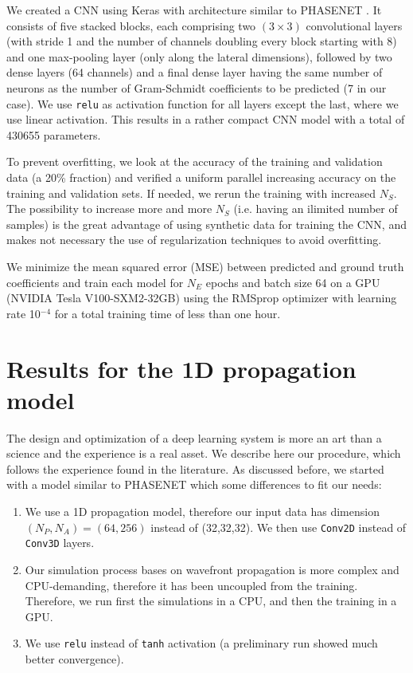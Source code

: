 \documentclass{iucr}
\begin{document}
We created a CNN using Keras \cite{keras} with architecture similar to PHASENET \cite{Saha2020}. It consists of five stacked blocks, each comprising two $(3 \times 3 )$ convolutional layers (with stride 1 and the number of channels doubling every block starting with 8) and one max-pooling layer (only along the lateral dimensions), followed by two dense layers (64 channels) and a final dense layer having the same number of neurons as the number of Gram-Schmidt coefficients to be predicted (7 in our case). We use \texttt{relu} as activation function for all layers except the last, where we use linear activation. This results in a rather compact CNN model with a total of 430655 parameters.

To prevent overfitting, we look at the accuracy of the training and validation data (a 20\% fraction) and verified a uniform parallel increasing accuracy on the training and validation sets. If needed, we rerun the training with increased $N_S$. The possibility to increase more and more $N_S$ (i.e. having an ilimited number of samples) is the great advantage of using synthetic data for training the CNN, and makes not necessary the use of regularization techniques to avoid overfitting.

We minimize the mean squared error (MSE) between predicted and ground truth coefficients and train each model for $N_E$ epochs and batch size 64 on a GPU (NVIDIA Tesla V100-SXM2-32GB) using the RMSprop optimizer with learning rate 10$^{-4}$ for a total training time of less than one hour.


\section{Results for the 1D propagation model}\label{sec:results}

The design and optimization of a deep learning system is more an art than a science \cite{chollet_book} and the experience is a real asset. We describe here our procedure, which follows the experience found in the literature. As discussed before, we started with a model similar to PHASENET \cite{Saha2020} which some differences to fit our needs: 
\begin{enumerate}
    \item We use a 1D propagation model, therefore our input data has dimension $(N_P,N_A)=(64,256)$ instead of (32,32,32). We then use \texttt{Conv2D} instead of \texttt{Conv3D} layers. 
    \item Our simulation process bases on wavefront propagation is more complex and CPU-demanding, therefore it has been uncoupled from the training. Therefore, we run first the simulations in a CPU, and then the training in a GPU.
    \item We use \texttt{relu} instead of \texttt{tanh} activation (a preliminary run showed much better convergence). 
\end{enumerate}
\end{document}
